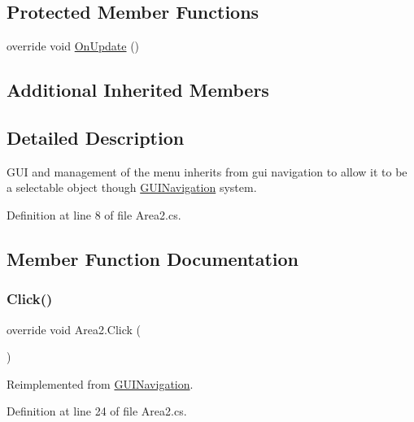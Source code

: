\subsection*{Protected Member Functions}
\begin{DoxyCompactItemize}
\item 
override void \mbox{\hyperlink{class_area2_ac85063b5dbded942092c9e3df2a8bf29}{On\+Update}} ()
\end{DoxyCompactItemize}
\subsection*{Additional Inherited Members}


\subsection{Detailed Description}
G\+UI and management of the menu inherits from gui navigation to allow it to be a selectable object though \mbox{\hyperlink{class_g_u_i_navigation}{G\+U\+I\+Navigation}} system. 



Definition at line 8 of file Area2.\+cs.



\subsection{Member Function Documentation}
\mbox{\label{class_area2_aeee901daa00ed32828b4979c5546cad5}} 
\subsubsection{\texorpdfstring{Click()}{Click()}}
{\footnotesize\ttfamily override void Area2.\+Click (\begin{DoxyParamCaption}{ }\end{DoxyParamCaption})\hspace{0.3cm}{\ttfamily [virtual]}}



Reimplemented from \mbox{\hyperlink{class_g_u_i_navigation_a175178a8bf2832e74c13f83bf8e8f714}{G\+U\+I\+Navigation}}.



Definition at line 24 of file Area2.\+cs.

\mbox{\label{class_area2_a448fdd1ac4233896ff455289c4d43aab}} 
